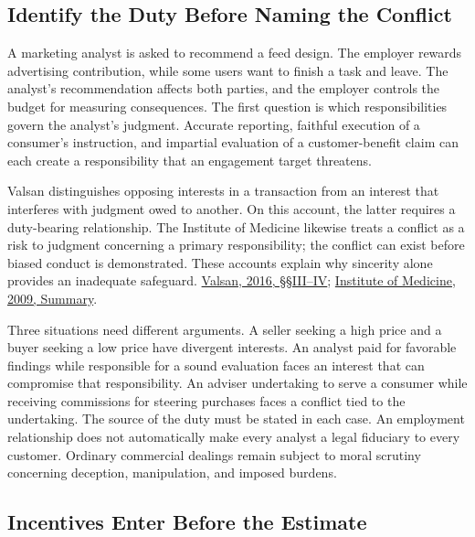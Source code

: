 \noindent \hypertarget{M09-identify-the-duty-before-naming-the-conflict}{%
\subsection{Identify the Duty Before Naming the
Conflict}\label{M09-identify-the-duty-before-naming-the-conflict}}

\noindent \noindent A marketing analyst is asked to recommend a feed design. The
employer rewards advertising contribution, while some users want to
finish a task and leave. The analyst's recommendation affects both
parties, and the employer controls the budget for measuring
consequences. The first question is which responsibilities govern the
analyst's judgment. Accurate reporting, faithful execution of a
consumer's instruction, and impartial evaluation of a customer-benefit
claim can each create a responsibility that an engagement target
threatens.

Valsan distinguishes opposing interests in a transaction from an
interest that interferes with judgment owed to another. On this account,
the latter requires a duty-bearing relationship. The Institute of
Medicine likewise treats a conflict as a risk to judgment concerning a
primary responsibility; the conflict can exist before biased conduct is
demonstrated. These accounts explain why sincerity alone provides an
inadequate safeguard.
\href{https://lawjournal.mcgill.ca/article/fiduciary-duties-conflict-of-interest-and-proper-exercise-of-judgment/}{Valsan,
2016, §§III--IV};
\href{https://www.ncbi.nlm.nih.gov/books/NBK22926/}{Institute of
Medicine, 2009, Summary}.

Three situations need different arguments. A seller seeking a high price
and a buyer seeking a low price have divergent interests. An analyst
paid for favorable findings while responsible for a sound evaluation
faces an interest that can compromise that responsibility. An adviser
undertaking to serve a consumer while receiving commissions for steering
purchases faces a conflict tied to the undertaking. The source of the
duty must be stated in each case. An employment relationship does not
automatically make every analyst a legal fiduciary to every customer.
Ordinary commercial dealings remain subject to moral scrutiny concerning
deception, manipulation, and imposed burdens.

\hypertarget{M09-incentives-enter-before-the-estimate}{%
\subsection{Incentives Enter Before the
Estimate}\label{M09-incentives-enter-before-the-estimate}}

